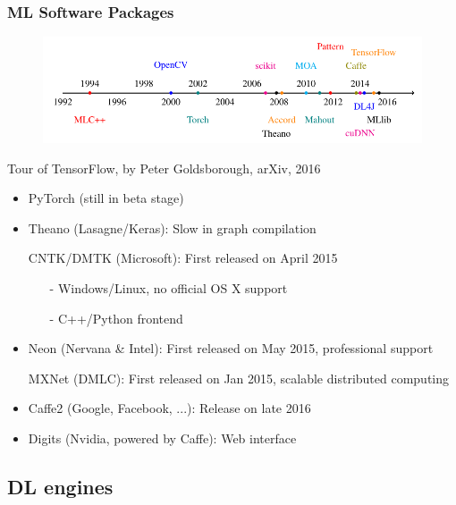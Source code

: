 \begin{frame}
  \MyLogo
  \frametitle{ML Software Packages}  

\vskip -10pt
\begin{figure}[htbp] %
   \centering
   \includegraphics[width=0.8\linewidth]{figures/ML.pdf} 
\end{figure}
\begin{center}
\vskip -12pt
{\color{red} \scriptsize
Tour of TensorFlow, by Peter Goldsborough, arXiv, 2016}
\end{center}

	\begin{itemize}\setlength\itemsep{0.25em}\footnotesize
	\item PyTorch (still in \alert{beta} stage)
	\item Theano (Lasagne/Keras): Slow in graph compilation
	\item[\raisebox{-0.4ex}{\alert{\HandRight}}] CNTK/DMTK (Microsoft): First released on April 2015
		\begin{itemize}
		\item[-] Windows/Linux, no official OS X support
		\item[-] C++/Python frontend
		\end{itemize}
	\item Neon (Nervana \& Intel): First released on May 2015, professional support
	\item[\raisebox{-0.4ex}{\alert{\HandRight}}] MXNet (DMLC): First released on Jan 2015, scalable distributed computing
	\item Caffe2 (Google, Facebook, ...): Release on late 2016
	\item Digits (Nvidia, powered by Caffe): Web interface
	\end{itemize}

\end{frame}

\subsection{DL engines}

